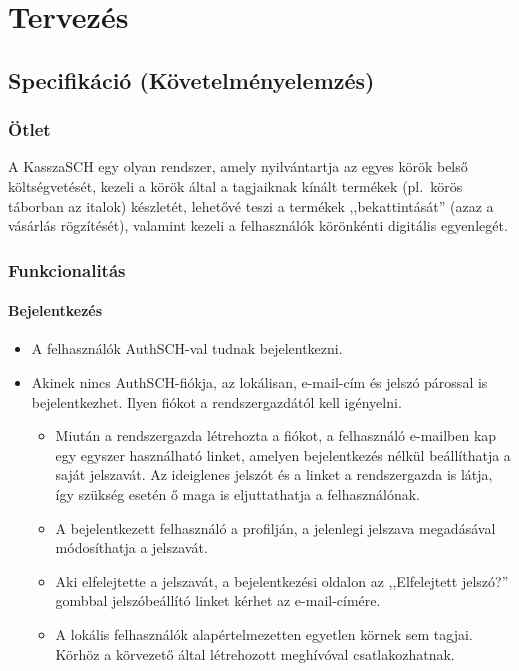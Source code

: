 \chapter{Tervezés}

\section{Specifikáció (Követelményelemzés)}


\subsection{Ötlet}

A KasszaSCH egy olyan rendszer, amely nyilvántartja az egyes körök belső költségvetését, kezeli a körök által a tagjaiknak kínált termékek (pl.\ körös táborban az italok) készletét, lehetővé teszi a termékek ,,bekattintását'' (azaz a vásárlás rögzítését), valamint kezeli a felhasználók körönkénti digitális egyenlegét.

\subsection{Funkcionalitás}

\subsubsection{Bejelentkezés}

\begin{itemize}
	\item A felhasználók AuthSCH-val tudnak bejelentkezni.
	\item Akinek nincs AuthSCH-fiókja, az lokálisan, e-mail-cím és jelszó párossal is bejelentkezhet. Ilyen fiókot a rendszergazdától kell igényelni.
	\begin{itemize}
		\item Miután a rendszergazda létrehozta a fiókot, a felhasználó e-mailben kap egy egyszer használható linket, amelyen bejelentkezés nélkül beállíthatja a saját jelszavát. Az ideiglenes jelszót és a linket a rendszergazda is látja, így szükség esetén ő maga is eljuttathatja a felhasználónak.
		\item A bejelentkezett felhasználó a profilján, a jelenlegi jelszava megadásával módosíthatja a jelszavát.
		\item Aki elfelejtette a jelszavát, a bejelentkezési oldalon az ,,Elfelejtett jelszó?'' gombbal jelszóbeállító linket kérhet az e-mail-címére.
		\item A lokális felhasználók alapértelmezetten egyetlen körnek sem tagjai. Körhöz a körvezető által létrehozott meghívóval csatlakozhatnak.
	\end{itemize}
\end{itemize}

